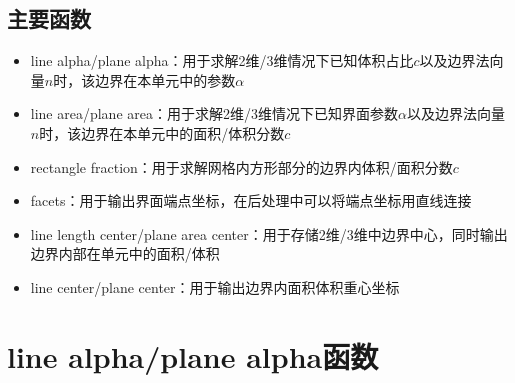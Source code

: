 \documentclass[lang=cn,11pt,a4paper]{elegantpaper}
\begin{document}
\subsection{主要函数}
\begin{itemize}
    \item line alpha/plane alpha：用于求解2维/3维情况下已知体积占比$c$以及边界法向量$n$时，该边界在本单元中的参数$\alpha$
    \item line area/plane area：用于求解2维/3维情况下已知界面参数$\alpha$以及边界法向量$n$时，该边界在本单元中的面积/体积分数$c$
    \item rectangle fraction：用于求解网格内方形部分的边界内体积/面积分数$c$
    \item facets：用于输出界面端点坐标，在后处理中可以将端点坐标用直线连接
    \item line length center/plane area center：用于存储2维/3维中边界中心，同时输出边界内部在单元中的面积/体积
    \item line center/plane center：用于输出边界内面积体积重心坐标
\end{itemize}
\section{line alpha/plane alpha函数}
\end{document}
